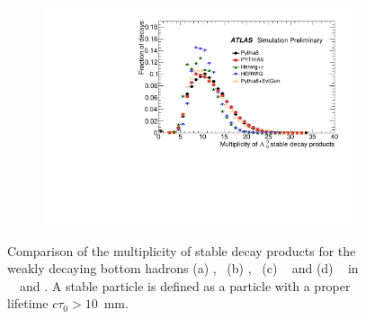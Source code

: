 \begin{figure}
\begin{subfigure}[]{0.45\textwidth}
\end{subfigure}
\begin{subfigure}[]{0.45\textwidth}
\includegraphics[width=\textwidth]{evtgen/figures/EvtGen/Lambdab0/h_species_multiplicity.pdf}
\end{subfigure}
\caption{Comparison of the multiplicity of stable decay products for the weakly decaying bottom hadrons 
(a) \Bo,~ (b) \Bp,~ (c) \Bs~ and (d) \Lb~
in \PythiaE\,~ \Pythia\, \newline  \Herwigpp\, ~\Herwig\ and \EvtGen.  A stable particle is defined
as a particle with a proper lifetime $c\tau_{0}>10$~mm. }
\label{fig:bmult}
\end{figure}

